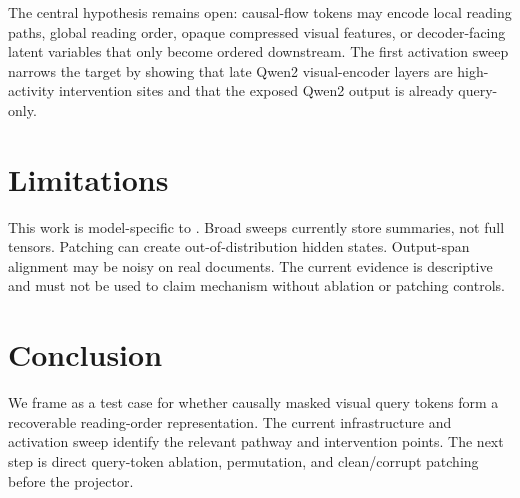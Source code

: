 \documentclass{article}
\begin{document}
The central hypothesis remains open: causal-flow tokens may encode local reading paths, global reading order, opaque compressed visual features, or decoder-facing latent variables that only become ordered downstream. The first activation sweep narrows the target by showing that late Qwen2 visual-encoder layers are high-activity intervention sites and that the exposed Qwen2 output is already query-only.

\section{Limitations}

This work is model-specific to \modelname{}. Broad sweeps currently store summaries, not full tensors. Patching can create out-of-distribution hidden states. Output-span alignment may be noisy on real documents. The current evidence is descriptive and must not be used to claim mechanism without ablation or patching controls.

\section{Conclusion}

We frame \modelname{} as a test case for whether causally masked visual query tokens form a recoverable reading-order representation. The current infrastructure and activation sweep identify the relevant pathway and intervention points. The next step is direct query-token ablation, permutation, and clean/corrupt patching before the projector.



\end{document}
